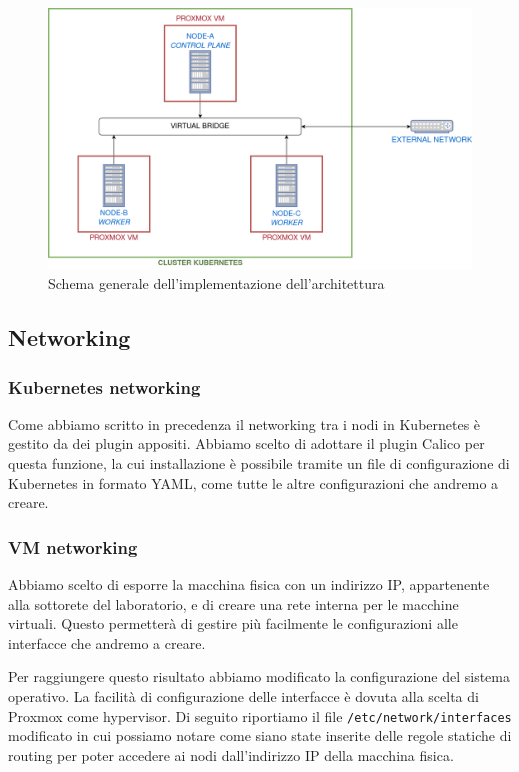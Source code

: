 \documentclass[12pt, hidelinks]{report}
\begin{document}
\begin{figure}[H]
    \centering
    \includegraphics[width=\linewidth]{16_schema-implementazione.png}
    \caption{Schema generale dell'implementazione dell'architettura}
    \label{fig:schema-implementazione}
\end{figure}

\subsection{Networking}
\subsubsection{Kubernetes networking}
Come abbiamo scritto in precedenza il networking tra i nodi in Kubernetes è gestito da dei plugin appositi. Abbiamo scelto di adottare il plugin Calico per questa funzione, la cui installazione è possibile tramite un file di configurazione di Kubernetes in formato YAML, come tutte le altre configurazioni che andremo a creare.

\subsubsection{VM networking}
Abbiamo scelto di esporre la macchina fisica con un indirizzo IP, appartenente alla sottorete del laboratorio, e di creare una rete interna per le macchine virtuali. Questo permetterà di gestire più facilmente le configurazioni alle interfacce che andremo a creare. 

Per raggiungere questo risultato abbiamo modificato la configurazione del sistema operativo. La facilità di configurazione delle interfacce è dovuta alla scelta di Proxmox come hypervisor. Di seguito riportiamo il file \texttt{/etc/network/interfaces} modificato in cui possiamo notare come siano state inserite delle regole statiche di routing per poter accedere ai nodi dall'indirizzo IP della macchina fisica.
\end{document}
